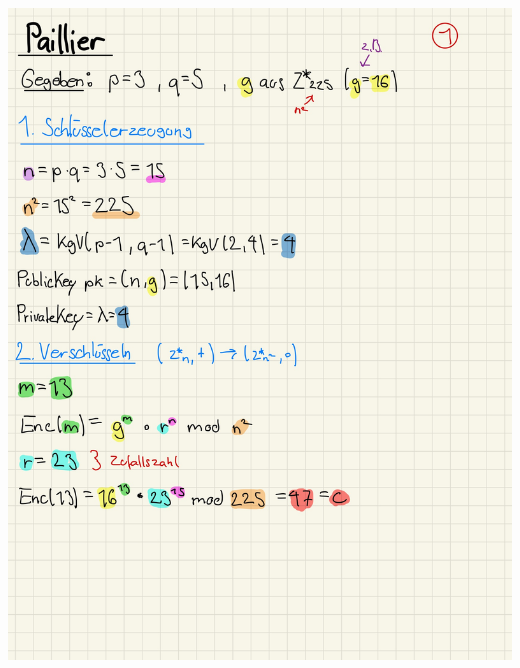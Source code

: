 \documentclass[11pt]{article}
\begin{document}
\begin{center}
	\includegraphics[scale=0.9]{img/pail1.jpg}\\
\end{center}

\break
\end{document}
